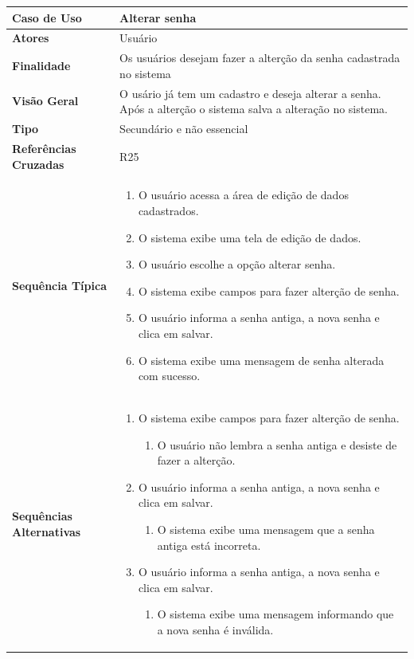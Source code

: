\documentclass[a4paper,11pt]{article}
\begin{document}
\begin{table}[H]
		\begin{tabularx}{\textwidth}{|l|X|}
		\hline
			\textbf{Caso de Uso} &  Alterar senha \\ \hline
			\textbf{Atores} & Usuário  \\ \hline
			\textbf{Finalidade} &  Os usuários desejam fazer a alterção da senha cadastrada no sistema \\ \hline
			\textbf{Visão Geral} & O usário já tem um cadastro e deseja alterar a senha. Após a alterção o sistema salva a alteração no sistema. \\ \hline
			\textbf{Tipo} & Secundário e não essencial \\ \hline
			\textbf{Referências Cruzadas} & R25 \\ \hline
			\textbf{Sequência Típica} & 
			\begin{enumerate}
			\item O usuário acessa a área de edição de dados cadastrados.
			\item O sistema exibe uma tela de edição de dados.
			\item O usuário escolhe a opção alterar senha.
			\item O sistema exibe campos para fazer alterção de senha.
			\item O usuário informa a senha antiga, a nova senha e clica em salvar.
			\item O sistema exibe uma mensagem de senha alterada com sucesso.
			\end{enumerate} \\ \hline
			\textbf{Sequências Alternativas} & 
			\begin{enumerate}
			\item O sistema exibe campos para fazer alterção de senha.
			\begin{enumerate}
			\item O usuário não lembra a senha antiga e desiste de fazer a alterção.
			\end{enumerate}
			\item O usuário informa a senha antiga, a nova senha e clica em salvar.			
			
			\begin{enumerate}
			\item O sistema exibe uma mensagem que a senha antiga está incorreta.
			\end{enumerate}
			
			\item O usuário informa a senha antiga, a nova senha e clica em salvar.			
			
			\begin{enumerate}
			\item O sistema exibe uma mensagem informando que a nova senha é inválida.
			\end{enumerate}			
			
			\end{enumerate} \\ \hline
		\end{tabularx}
\end{table}
\end{document}
